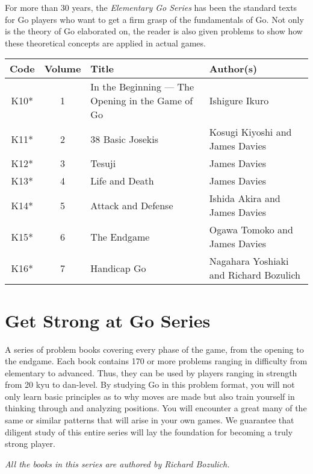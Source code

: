 For more than 30 years, the \emph{Elementary Go Series} has been the standard texts for Go players who want to get a firm grasp of the fundamentals of Go. Not only is the theory of Go elaborated on, the reader is also given problems to show how these theoretical concepts are applied in actual games.

\begin{longtable}{c|c|p{45mm}|p{45mm}} 
    \hline
    \textbf{Code} & \textbf{Volume} & \textbf{Title} &\textbf{Author(s)} \\
    \hline \hline
    K10* & 1 & In the Beginning --- The Opening in the Game of Go & Ishigure Ikuro \\
    \hline
    K11* & 2 & 38 Basic Josekis & Kosugi Kiyoshi and James Davies \\
    \hline
    K12* & 3 & Tesuji & James Davies \\
    \hline
    K13* & 4 & Life and Death & James Davies \\
    \hline
    K14* & 5 & Attack and Defense & Ishida Akira and James Davies \\
    \hline
    K15* & 6 & The Endgame & Ogawa Tomoko and James Davies \\
    \hline
    K16* & 7 & Handicap Go & Nagahara Yoshiaki and Richard Bozulich \\
    \hline
\end{longtable}

\section{Get Strong at Go Series}

A series of problem books covering every phase of the game, from the opening to the endgame. Each book contains 170 or more problems ranging in difficulty from elementary to advanced. Thus, they can be used by players ranging in strength from 20 kyu to dan-level. By studying Go in this problem format, you will not only learn basic principles as to why moves are made but also train yourself in thinking through and analyzing positions. You will encounter a great many of the same or similar patterns that will arise in your own games. We guarantee that diligent study of this entire series will lay the foundation for becoming a truly strong player.

\bigskip

\emph{All the books in this series are authored by Richard Bozulich.}

